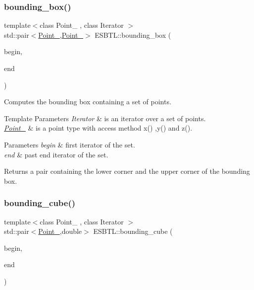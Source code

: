 \subsubsection{\texorpdfstring{bounding\+\_\+box()}{bounding\_box()}}
{\footnotesize\ttfamily template$<$class Point\+\_ , class Iterator $>$ \\
std\+::pair$<$\hyperlink{classESBTL_1_1Point__3}{Point\+\_},\hyperlink{classESBTL_1_1Point__3}{Point\+\_}$>$ E\+S\+B\+T\+L\+::bounding\+\_\+box (\begin{DoxyParamCaption}\item[{Iterator}]{begin,  }\item[{Iterator}]{end }\end{DoxyParamCaption})}

Computes the bounding box containing a set of points. 
\begin{DoxyTemplParams}{Template Parameters}
{\em Iterator} & is an iterator over a set of points. \\
\hline
{\em \hyperlink{classESBTL_1_1Point__3}{Point\+\_}} & is a point type with access method x() ,y() and z(). \\
\hline
\end{DoxyTemplParams}

\begin{DoxyParams}{Parameters}
{\em begin} & first iterator of the set. \\
\hline
{\em end} & past end iterator of the set. \\
\hline
\end{DoxyParams}
\begin{DoxyReturn}{Returns}
a pair containing the lower corner and the upper corner of the bounding box. 
\end{DoxyReturn}
\mbox{\label{namespaceESBTL_a2ced09786c7300de161c1b7b3b6c3784}} 
\subsubsection{\texorpdfstring{bounding\+\_\+cube()}{bounding\_cube()}}
{\footnotesize\ttfamily template$<$class Point\+\_ , class Iterator $>$ \\
std\+::pair$<$\hyperlink{classESBTL_1_1Point__3}{Point\+\_},double$>$ E\+S\+B\+T\+L\+::bounding\+\_\+cube (\begin{DoxyParamCaption}\item[{Iterator}]{begin,  }\item[{Iterator}]{end }\end{DoxyParamCaption})\hspace{0.3cm}{\ttfamily [inline]}}

